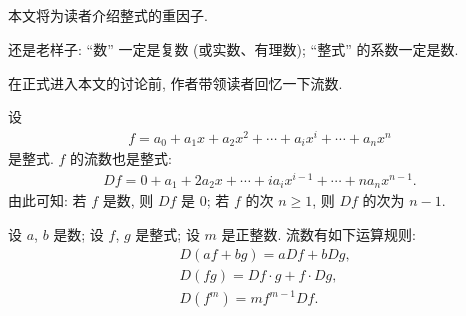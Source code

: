 \subsection*{\MultipleFactors}
\markright{\MultipleFactors}

本文将为读者介绍整式的重因子.

还是老样子: ``数'' 一定是复数 (或实数、有理数); ``整式'' 的系数一定是数.

在正式进入本文的讨论前, 作者带领读者回忆一下流数.

设
\begin{align*}
    f = a_0 + a_1 x + a_2 x^2 + \cdots + a_i x^i + \cdots + a_n x^n
\end{align*}
是整式. $f$ 的流数也是整式:
\begin{align*}
    Df = 0 + a_1 + 2a_2 x + \cdots + i a_i x^{i-1} + \cdots + n a_n x^{n-1}.
\end{align*}
由此可知: 若 $f$ 是数, 则 $Df$ 是 $0$; 若 $f$ 的次 $n \geq 1$, 则 $Df$ 的次为 $n - 1$.

设 $a$, $b$ 是数; 设 $f$, $g$ 是整式; 设 $m$ 是正整数. 流数有如下运算规则:
\begin{align*}
     & D(af + bg) = aDf + bDg,          \\
     & D(fg) = Df \cdot g + f \cdot Dg, \\
     & D(f^m) = mf^{m-1} Df.
\end{align*}

